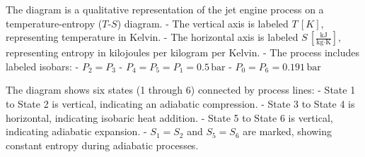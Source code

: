 The diagram is a qualitative representation of the jet engine process on a temperature-entropy (\( T \)-\( S \)) diagram.  
- The vertical axis is labeled \( T \, [K] \), representing temperature in Kelvin.  
- The horizontal axis is labeled \( S \, [\frac{\text{kJ}}{\text{kg·K}}] \), representing entropy in kilojoules per kilogram per Kelvin.  
- The process includes labeled isobars:  
  - \( P_2 = P_3 \)  
  - \( P_4 = P_5 = P_1 = 0.5 \, \text{bar} \)  
  - \( P_0 = P_6 = 0.191 \, \text{bar} \)  

The diagram shows six states (1 through 6) connected by process lines:  
- State 1 to State 2 is vertical, indicating an adiabatic compression.  
- State 3 to State 4 is horizontal, indicating isobaric heat addition.  
- State 5 to State 6 is vertical, indicating adiabatic expansion.  
- \( S_1 = S_2 \) and \( S_5 = S_6 \) are marked, showing constant entropy during adiabatic processes.
